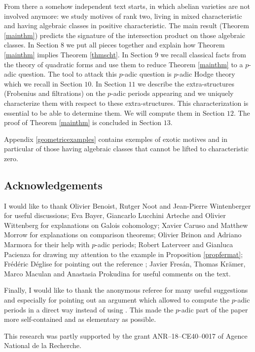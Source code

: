\documentclass[11pt]{amsart}
\begin{document}
From there a somehow independent text starts, in which abelian varieties are not involved anymore: we study motives of rank two, living in mixed characteristic and having algebraic classes in positive characteristic. The main result (Theorem \ref{mainthm}) predicts the signature of the intersection product on those algebraic classes. In Section $8$ we put all pieces together and explain how Theorem \ref{mainthm} implies Theorem \ref{thmscht}. In Section $9$ we recall classical facts   from the theory of quadratic forms and use them to reduce Theorem \ref{mainthm}  to a $p$-adic question. The tool to attack this $p$-adic question is $p$-adic Hodge theory which we recall in Section $10$. In Section $11$ we describe the extra-structures (Frobenius and filtrations) on the   $p$-adic periods appearing and we uniquely characterize them with respect to these extra-structures. This characterization is essential to be able to determine them. We will compute them in  Section $12$. The proof of Theorem \ref{mainthm} is concluded in Section $13$.

Appendix \ref{geometricexamples} contains exemples of exotic motives and in particular of those having algebraic classes that cannot be lifted to characteristic zero.
\subsection*{Acknowledgements}
I would like to thank  Olivier Benoist,  Rutger Noot and Jean-Pierre Wintenberger for useful discussions; Eva Bayer, Giancarlo Lucchini Arteche and Olivier Wittenberg for explanations on  Galois cohomology; Xavier Caruso and Matthew Morrow for explanations on comparison theorems;   Olivier Brinon and Adriano Marmora for their help with $p$-adic periods; Robert Laterveer and Gianluca Pacienza for drawing my attention to the example in Proposition  \ref{propfermat}; Fr\'ed\'eric D\'eglise for pointing out the reference \cite{NiziFred}; Javier Fres\'an, Thomas Kr\"amer, Marco Maculan and Anastasia Prokudina for useful comments on the text.

Finally, I would like to thank the anonymous referee for many useful suggestions and especially for pointing out an argument which allowed to compute the $p$-adic periods in a direct way instead of using \cite[\S 9]{Colmez}. This made the $p$-adic part of the paper more self-contained and as elementary as possible. 

This research was partly supported by the grant ANR--18--CE40--0017 of Agence National de la Recherche. 
\end{document}
